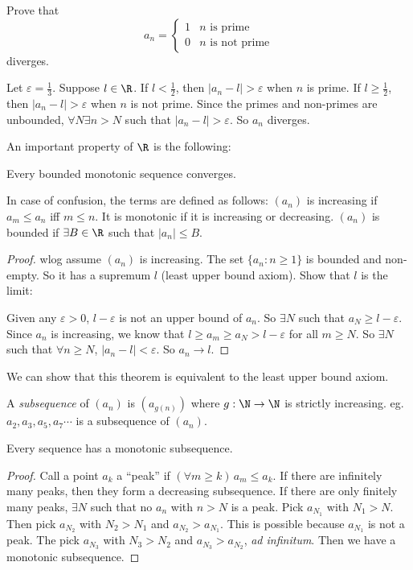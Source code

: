 \documentclass[a4paper]{article}
\begin{document}
\begin{eg}
  Prove that
  \[
    a_n = \begin{cases}1 & n\text{ is prime}\\ 0 & n\text{ is not prime}\end{cases}
  \]
  diverges.

  Let $\varepsilon = \frac{1}{3}$. Suppose $l\in \R$. If $l < \frac{1}{2}$, then $|a_n - l| > \varepsilon$ when $n$ is prime. If $l\geq \frac{1}{2}$, then $|a_n - l| > \varepsilon$ when $n$ is not prime. Since the primes and non-primes are unbounded, $\forall N\exists n > N$ such that $|a_n - l| > \varepsilon$. So $a_n$ diverges.
\end{eg}

An important property of $\R$ is the following:
\begin{thm}
  Every bounded monotonic sequence converges.
\end{thm}
In case of confusion, the terms are defined as follows: $(a_n)$ is increasing if $a_m \leq a_n$ iff $m \leq n$. It is monotonic if it is increasing or decreasing. $(a_n)$ is bounded if $\exists B\in \R$ such that $|a_n| \leq B$.

\begin{proof}
  wlog assume $(a_n)$ is increasing. The set $\{a_n: n\geq 1\}$ is bounded and non-empty. So it has a supremum $l$ (least upper bound axiom). Show that $l$ is the limit:

  Given any $\varepsilon >0$, $l - \varepsilon$ is not an upper bound of $a_n$. So $\exists N$ such that $a_N \geq l - \varepsilon$. Since $a_n$ is increasing, we know that $l \geq a_m \geq a_N > l - \varepsilon$ for all $m \geq N$. So $\exists N $ such that $\forall n\geq N$, $|a_n - l| < \varepsilon$. So $a_n \to l$.
\end{proof}
We can show that this theorem is equivalent to the least upper bound axiom.

\begin{defi}[Subsequence]
  A \emph{subsequence} of $(a_n)$ is $(a_{g(n)})$ where $g: \N\to\N$ is strictly increasing. eg. $a_2, a_3, a_5, a_7\cdots$ is a subsequence of $(a_n)$.
\end{defi}

\begin{thm}
  Every sequence has a monotonic subsequence.
\end{thm}

\begin{proof}
  Call a point $a_k$ a ``peak'' if $(\forall m \geq k)\,a_m \leq a_k$. If there are infinitely many peaks, then they form a decreasing subsequence. If there are only finitely many peaks, $\exists N$ such that no $a_n$ with $n > N$ is a peak. Pick $a_{N_1}$ with $N_1 > N$. Then pick $a_{N_2}$ with $N_2 > N_1$ and $a_{N_2} > a_{N_1}$. This is possible because $a_{N_1}$ is not a peak. The pick $a_{N_3}$ with $N_3 > N_2$ and $a_{N_3}> a_{N_2}$, \emph{ad infinitum}. Then we have a monotonic subsequence.
\end{proof}
\end{document}
